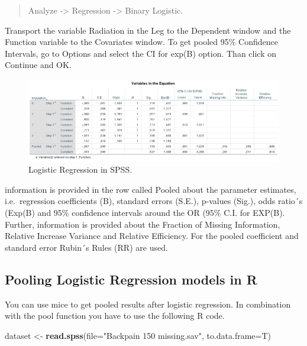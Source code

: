 \documentclass[]{book}
\newenvironment{Shaded}{\begin{snugshade}}{\end{snugshade}}
\newcommand{\KeywordTok}[1]{\textcolor[rgb]{0.13,0.29,0.53}{\textbf{#1}}}
\newcommand{\DataTypeTok}[1]{\textcolor[rgb]{0.13,0.29,0.53}{#1}}
\newcommand{\StringTok}[1]{\textcolor[rgb]{0.31,0.60,0.02}{#1}}
\newcommand{\NormalTok}[1]{#1}
\begin{document}
\begin{quote}
Analyze -\textgreater{} Regression -\textgreater{} Binary Logistic.
\end{quote}

Transport the variable Radiation in the Leg to the Dependent window and
the Function variable to the Covariates window. To get pooled 95\%
Confidence Intervals, go to Options and select the CI for exp(B) option.
Than click on Continue and OK.

\begin{figure}

{\centering \includegraphics[width=0.9\linewidth]{images/table5.9} 

}

\caption{Logistic Regression in SPSS.}\label{fig:tab5-9}
\end{figure}

information is provided in the row called Pooled about the parameter
estimates, i.e.~regression coefficients (B), standard errors (S.E.),
p-values (Sig.), odds ratio´s (Exp(B) and 95\% confidence intervals
around the OR (95\% C.I. for EXP(B). Further, information is provided
about the Fraction of Missing Information, Relative Increase Variance
and Relative Efficiency. For the pooled coefficient and standard error
Rubin´s Rules (RR) are used.

\subsection{Pooling Logistic Regression models in
R}\label{pooling-logistic-regression-models-in-r}

You can use mice to get pooled results after logistic regression. In
combination with the pool function you have to use the following R code.

\begin{Shaded}
\begin{Highlighting}[]
\NormalTok{dataset <-}\StringTok{ }\KeywordTok{read.spss}\NormalTok{(}\DataTypeTok{file=}\StringTok{"Backpain 150 missing.sav"}\NormalTok{, }\DataTypeTok{to.data.frame=}\NormalTok{T)}
\end{Highlighting}
\end{Shaded}
\end{document}
